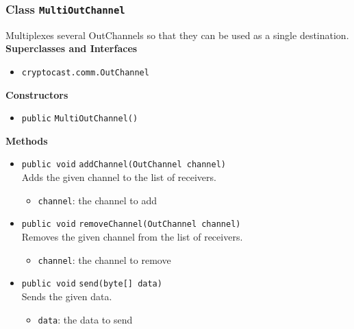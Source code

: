 \subsubsection{Class \lstinline|MultiOutChannel|}
Multiplexes several OutChannels so that they can be used as a single
 destination. \\


\textbf{Superclasses and Interfaces}
\begin{itemize}
\item \lstinline|cryptocast.comm.OutChannel|
\end{itemize}



\textbf{Constructors}
\begin{itemize}
\item \lstinline|public| \lstinline|MultiOutChannel|\lstinline|()|




\end{itemize}


\textbf{Methods}
\begin{itemize}
\item \lstinline|public void| \lstinline|addChannel|\lstinline|(OutChannel channel)|\\
Adds the given channel to the list of receivers.
\begin{itemize}
\item \lstinline|channel|: the channel to add
\end{itemize}



\item \lstinline|public void| \lstinline|removeChannel|\lstinline|(OutChannel channel)|\\
Removes the given channel from the list of receivers.
\begin{itemize}
\item \lstinline|channel|: the channel to remove
\end{itemize}



\item \lstinline|public void| \lstinline|send|\lstinline|(byte[] data)|\\
Sends the given data.
\begin{itemize}
\item \lstinline|data|: the data to send
\end{itemize}



\end{itemize}

